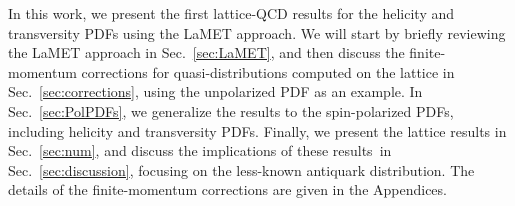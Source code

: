 In this work, we present the first lattice-QCD results for the helicity and transversity PDFs using the LaMET approach.
We will start by briefly reviewing the LaMET approach in Sec.~\ref{sec:LaMET}, 
and then discuss the finite-momentum corrections for quasi-distributions computed on the lattice in Sec.~\ref{sec:corrections}, using the unpolarized PDF as an example.
In Sec.~\ref{sec:PolPDFs}, we generalize the results to the spin-polarized PDFs, including helicity and transversity PDFs. Finally, we present the lattice results in Sec.~\ref{sec:num}, and discuss the
implications of these results~in Sec.~\ref{sec:discussion}, focusing on the
less-known antiquark distribution. The details of the finite-momentum corrections are given in the Appendices.
